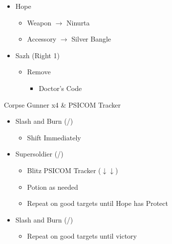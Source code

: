 \begin{multicols}{2}
\begin{menu}
\begin{itemize}
    \equip
    \begin{itemize}
        \item Hope
        \begin{itemize}
                \item Weapon $\rightarrow$ Ninurta
                \item Accessory $\rightarrow$ Silver Bangle
        \end{itemize}
        \item Sazh (Right 1)
        \begin{itemize}
            \item Remove
            \begin{itemize}
                \item Doctor's Code
            \end{itemize}
        \end{itemize}
    \end{itemize}
\end{itemize}
\end{menu}

\renewcommand{\first}{[1] Slash and Burn (\com/\rav)}
\renewcommand{\second}{[2] Supersoldier (\com/\syn)}

\begin{battle}{Corpse Gunner x4 \& PSICOM Tracker}
\begin{itemize}
    \item \first
    \begin{itemize}
        \item Shift Immediately
    \end{itemize}
    \item \second
    \begin{itemize}
        \item Blitz PSICOM Tracker ($\downarrow\downarrow$)
        \item Potion as needed
        \item Repeat on good targets until Hope has Protect
    \end{itemize}
    \item \first
    \begin{itemize}
        \item Repeat on good targets until victory
    \end{itemize}
\end{itemize}
 
\end{battle}


\end{multicols}
